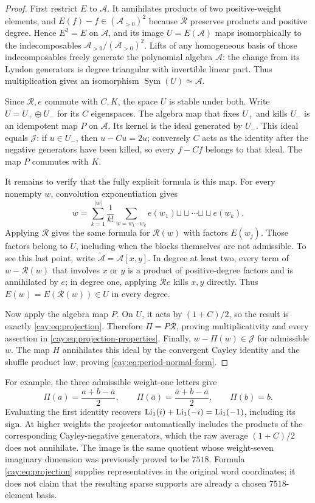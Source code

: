 \begin{proof}
First restrict $E$ to $\mathcal A$.  It annihilates products of two
positive-weight elements, and $E(f)-f\in(\mathcal A_{>0})^2$ because
$\mathcal R$ preserves products and positive degree.  Hence $E^2=E$
on $\mathcal A$, and its image $U=E(\mathcal A)$ maps isomorphically to
the indecomposables
$\mathcal A_{>0}/(\mathcal A_{>0})^2$.  Lifts of any homogeneous basis
of those indecomposables freely generate the polynomial algebra
$\mathcal A$: the change from its Lyndon generators is degree triangular
with invertible linear part.  Thus multiplication gives an isomorphism
$\operatorname{Sym}(U)\simeq\mathcal A$.

Since $\mathcal R,e$ commute with $C,K$, the space $U$ is stable under
both.  Write $U=U_+\oplus U_-$ for its $C$ eigenspaces.  The algebra
map that fixes $U_+$ and kills $U_-$ is an idempotent map $P$ on
$\mathcal A$.  Its kernel is the ideal generated by $U_-$.  This ideal
equals $\mathcal J$: if $u\in U_-$, then $u-Cu=2u$; conversely $C$
acts as the identity after the negative generators have been killed,
so every $f-Cf$ belongs to that ideal.  The map $P$ commutes with $K$.

It remains to verify that the fully explicit formula is this map.
For every nonempty $w$, convolution exponentiation gives
\[
 w=\sum_{k=1}^{|w|}\frac1{k!}
   \sum_{w=w_1\cdots w_k}
    e(w_1)\mathbin{\sqcup\!\sqcup}\cdots
     \mathbin{\sqcup\!\sqcup}e(w_k).
\]
Applying $\mathcal R$ gives the same formula for $\mathcal R(w)$
with factors $E(w_j)$.  Those factors belong to $U$, including when
the blocks themselves are not admissible.  To see this last point,
write $\widetilde{\mathcal A}=\mathcal A[x,y]$.  In degree at least
two, every term of $w-\mathcal R(w)$ that involves $x$ or $y$ is a
product of positive-degree factors and is annihilated by $e$; in degree
one, applying $\mathcal R e$ kills $x,y$ directly.  Thus
$E(w)=E(\mathcal R(w))\in U$ in every degree.

Now apply the algebra map $P$.  On $U$, it acts by $(1+C)/2$, so the
result is exactly \eqref{cay:eq:projection}.  Therefore
$\Pi=P\mathcal R$, proving multiplicativity and every assertion in
\eqref{cay:eq:projection-properties}.  Finally, $w-\Pi(w)\in\mathcal J$
for admissible $w$.  The map $H$ annihilates this ideal by the convergent
Cayley identity and the shuffle product law, proving
\eqref{cay:eq:period-normal-form}.
\end{proof}

For example, the three admissible weight-one letters give
\[
 \Pi(a)=\frac{a+b-\bar a}{2},\qquad
 \Pi(\bar a)=\frac{\bar a+b-a}{2},\qquad \Pi(b)=b.
\]
Evaluating the first identity recovers
$\operatorname{Li}_1(i)+\operatorname{Li}_1(-i)=\operatorname{Li}_1(-1)$, including its sign.  At higher weights
the projector automatically includes the products of the corresponding
Cayley-negative generators, which the raw average $(1+C)/2$ does not
annihilate.  The image is the same quotient whose weight-seven imaginary
dimension was previously proved to be $7518$.  Formula
\eqref{cay:eq:projection} supplies representatives in the original word
coordinates; it does not claim that the resulting sparse supports are
already a chosen $7518$-element basis.

